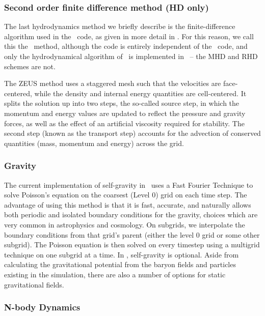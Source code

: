 \subsubsection{Second order finite difference method (HD only)}

The last hydrodynamics method we briefly describe is the
finite-difference algorithm used in the \zeus\ code, as given in more
detail in \citet{Stone92a}.  For this reason, we call this the \zeus\
method, although the code is entirely independent of the \zeus\ code,
and only the hydrodynamical algorithm of \zeus\ is implemented in
\enzo\ -- the MHD and RHD schemes are not.

The ZEUS method uses a staggered mesh such that the velocities are
face-centered, while the density and internal energy quantities are
cell-centered.  It splits the solution up into two steps, the
so-called source step, in which the momentum and energy values are
updated to reflect the pressure and gravity forces, as well as the
effect of an artificial viscosity required for stability.  The second
step (known as the transport step) accounts for the advection of
conserved quantities (mass, momentum and energy) across the grid.

\subsubsection{Gravity}

The current implementation of self-gravity in \enzo\ uses a Fast
Fourier Technique \citep{Hockney88} to solve Poisson's equation on the
coarsest (Level 0) grid on each time step.  The advantage of using this method is that
it is fast, accurate, and 
naturally allows both periodic and isolated boundary conditions for
the gravity, choices which are very common in astrophysics and
cosmology.  On subgrids, we interpolate the boundary conditions from
that grid's parent (either the level 0 grid or some other subgrid).
The Poisson equation is then solved on every timestep using a multigrid technique on one
subgrid at a time.  In
\enzo, self-gravity is optional.  Aside from calculating the
gravitational potential from the baryon fields and particles existing
in the simulation, there are also a number of options for static gravitational fields.

\subsubsection{N-body Dynamics}


